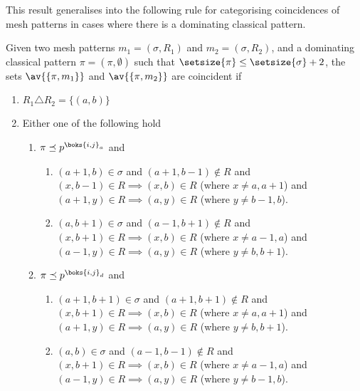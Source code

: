 This result generalises into the following rule for categorising coincidences
of mesh patterns in cases where there is a dominating classical pattern.

\begin{proposition}
    \label{prop:dom2}
    Given two mesh patterns \(m_1 =(\sigma, R_1)\) and \(m_2 = (\sigma, R_2)\),
    and a dominating classical pattern \(\pi = (\pi,\emptyset)\) such that
    \(\setsize{\pi} \le \setsize{\sigma} + 2\), the sets \(\av{\{\pi,m_1\}}\) and
    \(\av{\{\pi,m_2\}}\) are coincident if

    \begin{enumerate}
        \item \(R_1 \triangle R_2 = \{(a,b)\}\)
        \item\label{prop:dom2:cond} Either one of the following hold \begin{enumerate}
                \item\label{prop:dom2:condc} \(\pi \preceq p^{\boks{i,j}_a}\) and
                        \begin{enumerate}
                            \item \((a+1,b) \in \sigma\) and \((a+1,b-1)\notin R\) and \\
                                \((x,b-1)\in R \implies (x,b) \in R \) (where \(x\neq a,a+1\)) and\\
                                  \((a+1,y)\in R \implies (a,y) \in R\) (where \(y\neq b-1,b\)).
                            \item \((a,b+1) \in \sigma\) and \((a-1,b+1)\notin R\) and \\
                                  \((x,b+1)\in R \implies (x,b) \in R\) (where \(x\neq a-1,a\)) and\\
                                  \((a-1,y)\in R \implies (a,y) \in R\) (where \(y\neq b,b+1\)).
                        \end{enumerate}
                    \item \(\pi \preceq p^{\boks{i,j}_d}\) and
                        \begin{enumerate}
                            \item \((a+1,b+1) \in \sigma\) and \((a+1,b+1)\notin R\) and \\
                                  \((x,b+1)\in R \implies (x,b) \in R\) (where \(x\neq a,a+1\)) and\\
                                  \((a+1,y)\in R \implies (a,y) \in R\) (where \(y\neq b,b+1\)).
                            \item \((a,b) \in \sigma\) and \((a-1,b-1)\notin R\) and \\
                                  \((x,b+1)\in R \implies (x,b) \in R\) (where \(x\neq a-1,a\)) and\\
                                  \((a-1,y)\in R \implies (a,y) \in R\)  (where \(y\neq b-1,b\)).
                        \end{enumerate}
                \end{enumerate}
    \end{enumerate}
\end{proposition}

